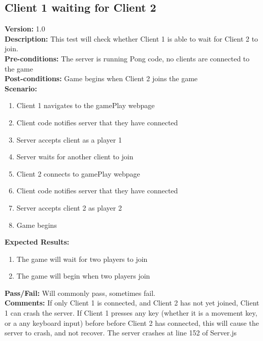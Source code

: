 \documentclass[12pt]{article}
\begin{document}
    \subsection{Client 1 waiting for Client 2}
    \textbf{Version:} 1.0\\
    \textbf{Description:} This test will check whether Client 1 is able to wait for Client 2 to join. \\
    \textbf{Pre-conditions:} The server is running Pong code, no clients are connected to the game\\
    \textbf{Post-conditions:} Game begins when Client 2 joins the game\\
    \textbf{Scenario:}
    \begin{enumerate}
        \item Client 1 navigates to the gamePlay webpage
        \item Client code notifies server that they have connected
        \item Server accepts client as a player 1
        \item Server waits for another client to join
        \item Client 2 connects to gamePlay webpage
        \item Client code notifies server that they have connected
        \item Server accepts client 2 as player 2
        \item Game begins
    \end{enumerate}
    \textbf{Expected Results:}
    \begin{enumerate}
        \item The game will wait for two players to join
        \item The game will begin when two players join
    \end{enumerate}
    \textbf{Pass/Fail:} Will commonly pass, sometimes fail.\\
    \textbf{Comments:} If only Client 1 is connected, and Client 2 has not yet joined, Client 1 can crash the server. If Client 1 presses any key (whether it is a movement key, or a any keyboard input) before before Client 2 has connected, this will cause the server to crash, and not recover.  The server crashes at line 152 of Server.js\\
\end{document}
